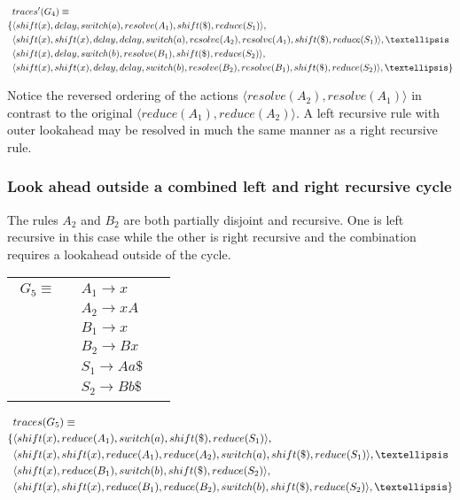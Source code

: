 \documentclass[envcountsame,runningheads]{llncs}
\begin{document}
{\small\parbox{.3\textwidth}{\begin{align*}
&traces^{\prime}(G_4) \equiv \\
\{ & \langle shift(x), delay, switch(a), resolve(A_1), shift(\$), reduce(S_1) \rangle,\\
   & \langle shift(x), shift(x), delay, delay, switch(a), resolve(A_2), resolve(A_1), shift(\$), reduce(S_1) \rangle, \textellipsis \\
   & \langle shift(x), delay, switch(b), resolve(B_1), shift(\$), reduce(S_2) \rangle,\\
   & \langle shift(x), shift(x), delay, delay, switch(b), resolve(B_2), resolve(B_1), shift(\$), reduce(S_2) \rangle, \textellipsis \}
\end{align*}}}

Notice the reversed ordering of the actions $\langle resolve(A_2), resolve(A_1) \rangle$ in contrast to the original $\langle reduce(A_1), reduce(A_2) \rangle$.
A left recursive rule with outer lookahead may be resolved in much the same manner as a right recursive rule.

\subsubsection{Look ahead outside a combined left and right recursive cycle}
The rules $A_2$ and $B_2$ are both partially disjoint and recursive. One is left recursive in this case while the other is right recursive and the combination
requires a lookahead outside of the cycle.

\begin{tabular}[t]{cl}
\parbox{.3\textwidth}{
\begin{align*}
G_5 \equiv \quad & A_1 \rightarrow x\\
                 & A_2 \rightarrow x A\\
                 & B_1 \rightarrow x\\
                 & B_2 \rightarrow B x\\
                 & S_1 \rightarrow A a \$\\
                 & S_2 \rightarrow B b \$
\end{align*}}
\parbox{.6\textwidth}{}
\end{tabular}

{\small\parbox{.3\textwidth}{\begin{align*}
&traces(G_5) \equiv \\
\{ & \langle shift(x), reduce(A_1), switch(a), shift(\$), reduce(S_1) \rangle,\\
   & \langle shift(x), shift(x), reduce(A_1), reduce(A_2), switch(a), shift(\$), reduce(S_1) \rangle, \textellipsis \\
   & \langle shift(x), reduce(B_1), switch(b), shift(\$), reduce(S_2) \rangle,\\
   & \langle shift(x), shift(x), reduce(B_1), reduce(B_2), switch(b), shift(\$), reduce(S_2) \rangle, \textellipsis \}
\end{align*}}}
\end{document}
